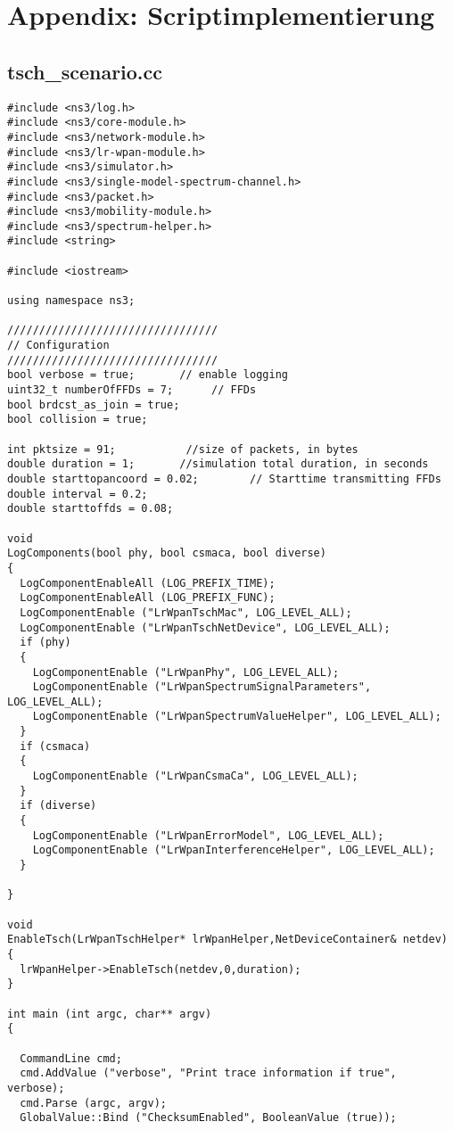 \section{Appendix: Scriptimplementierung}

\subsection{tsch\_scenario.cc}

\begin{lstlisting}[frame=single]
#include <ns3/log.h>
#include <ns3/core-module.h>
#include <ns3/network-module.h>
#include <ns3/lr-wpan-module.h>
#include <ns3/simulator.h>
#include <ns3/single-model-spectrum-channel.h>
#include <ns3/packet.h>
#include <ns3/mobility-module.h>
#include <ns3/spectrum-helper.h>
#include <string>

#include <iostream>

using namespace ns3;

/////////////////////////////////
// Configuration
/////////////////////////////////
bool verbose = true;       // enable logging
uint32_t numberOfFFDs = 7;      // FFDs
bool brdcst_as_join = true;
bool collision = true;

int pktsize = 91;           //size of packets, in bytes
double duration = 1;       //simulation total duration, in seconds
double starttopancoord = 0.02;        // Starttime transmitting FFDs
double interval = 0.2;
double starttoffds = 0.08;

void
LogComponents(bool phy, bool csmaca, bool diverse)
{
  LogComponentEnableAll (LOG_PREFIX_TIME);
  LogComponentEnableAll (LOG_PREFIX_FUNC);
  LogComponentEnable ("LrWpanTschMac", LOG_LEVEL_ALL);
  LogComponentEnable ("LrWpanTschNetDevice", LOG_LEVEL_ALL);
  if (phy)
  {
    LogComponentEnable ("LrWpanPhy", LOG_LEVEL_ALL);
    LogComponentEnable ("LrWpanSpectrumSignalParameters", LOG_LEVEL_ALL);
    LogComponentEnable ("LrWpanSpectrumValueHelper", LOG_LEVEL_ALL);
  }
  if (csmaca)
  {
    LogComponentEnable ("LrWpanCsmaCa", LOG_LEVEL_ALL);
  }
  if (diverse)
  {
    LogComponentEnable ("LrWpanErrorModel", LOG_LEVEL_ALL);
    LogComponentEnable ("LrWpanInterferenceHelper", LOG_LEVEL_ALL);
  }

}

void
EnableTsch(LrWpanTschHelper* lrWpanHelper,NetDeviceContainer& netdev)
{
  lrWpanHelper->EnableTsch(netdev,0,duration);
}

int main (int argc, char** argv)
{

  CommandLine cmd;
  cmd.AddValue ("verbose", "Print trace information if true", verbose);
  cmd.Parse (argc, argv);
  GlobalValue::Bind ("ChecksumEnabled", BooleanValue (true));


\end{lstlisting}
